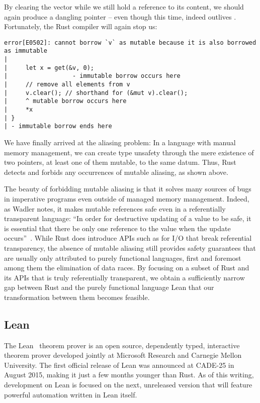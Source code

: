 By clearing the vector while we still hold a reference to its content, we should
again produce a dangling pointer -- even though this time,  indeed
outlives . Fortunately, the Rust compiler will again stop us:

\begin{verbatim}
error[E0502]: cannot borrow `v` as mutable because it is also borrowed as immutable
|
|     let x = get(&v, 0);
|                  - immutable borrow occurs here
|     // remove all elements from v
|     v.clear(); // shorthand for (&mut v).clear();
|     ^ mutable borrow occurs here
|     *x
| }
| - immutable borrow ends here
\end{verbatim}

We have finally arrived at the aliasing problem: In a language with manual
memory management, we can create type unsafety through the mere existence of two
pointers, at least one of them mutable, to the same datum. Thus, Rust detects
and forbids any occurrences of mutable aliasing, as shown above.

The beauty of forbidding mutable aliasing is that it solves many sources of bugs
in imperative programs even outside of managed memory management. Indeed, as
Wadler notes, it makes mutable references safe even in a referentially
transparent language: ``In order for destructive updating of a value to be safe,
it is essential that there be only one reference to the value when the update
occurs''~\cite{wadler1990linear}. While Rust does introduce APIs such as for I/O that break referential
transparency, the absence of mutable aliasing still provides safety guarantees
that are usually only attributed to purely functional languages, first and
foremost among them the elimination of data races. By focusing on a subset of
Rust and its APIs that is truly referentially transparent, we obtain a
sufficiently narrow gap between Rust and the purely functional language Lean
that our transformation between them becomes feasible.

\subsection{Lean}

The Lean~\cite{de2015lean} theorem prover is an open source, dependently typed,
interactive theorem prover developed jointly at Microsoft Research and Carnegie
Mellon University. The first official release of Lean was announced at CADE-25
in August 2015, making it just a few months younger than Rust. As of this
writing, development on Lean is focused on the next, unreleased version that
will feature powerful automation written in Lean itself.

